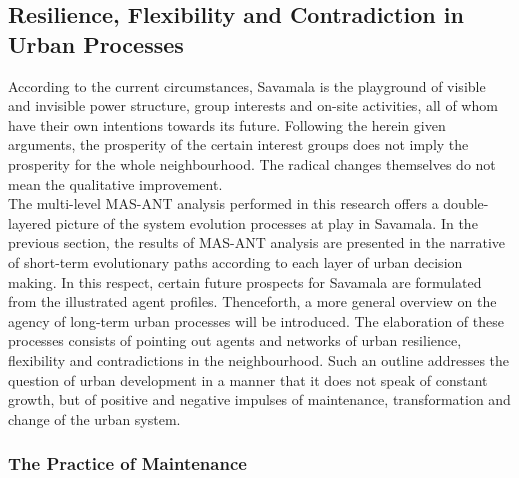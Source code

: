 \documentclass[11pt]{report}
\begin{document}
\subsection{Resilience, Flexibility and Contradiction in Urban Processes}

According to the current circumstances, Savamala is the playground of 
visible and invisible power structure, group interests and on-site activities, all of whom have their own intentions towards its future.
Following the herein given arguments, the prosperity of the certain interest groups does not imply the prosperity for the whole neighbourhood. The radical changes themselves do not mean the qualitative improvement.
\\
The multi-level MAS-ANT analysis performed in this research offers a double-layered picture of the system evolution processes at play in Savamala.
In the previous section, the results of MAS-ANT analysis are presented in the narrative of short-term evolutionary paths according to each layer of urban decision making.
In this respect, certain future prospects for Savamala are formulated from the illustrated agent profiles.
Thenceforth, a more general overview on the agency of long-term urban processes will be introduced. The elaboration of these processes consists of pointing out agents and networks of urban resilience, flexibility and contradictions in the neighbourhood.
Such an outline addresses the question of urban development in a manner that it does not speak of constant growth, but of positive and negative impulses of maintenance, transformation and change of the urban system.

\subsubsection{The Practice of Maintenance}
\end{document}
